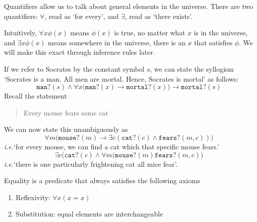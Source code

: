 \documentclass{scrbook}
\renewcommand{\implies}{\to}
\renewcommand{\iff}{\leftrightarrow}
\newcommand{\ie}{\emph{i.e.}\xspace}
\begin{document}
\begin{defn}[quantifier]
  Quantifiers allow us to talk about general elements in the universe. There are two quantifiers: $\forall$, read as `for every', and $\exists$, read as `there exists'.

  Intuitively, $\forall x \phi(x)$ means $\phi(x)$ is true, no matter what $x$ is in the universe, and $\exists x \phi(x)$ means somewhere in the universe, there is an $x$ that satisfies $\phi$. We will make this exact through inference rules later.
\end{defn}
If we refer to Socrates by the constant symbol $s$, we can state the syllogism `Socrates is a man. All men are mortal. Hence, Socrates is mortal' as follows:
\[
\texttt{man?}(s) \wedge \forall x \bigl(\texttt{man?}(x)\implies\texttt{mortal?}(x)\bigr) \implies \texttt{mortal?}(s)
\] 
Recall the statement
\begin{quote}
  Every mouse fears some cat
\end{quote}
We can now state this unambiguously as 
\[
\forall m \bigr(\texttt{mouse?}(m) \implies \exists c (\texttt{cat?}(c)\wedge \texttt{fears?}(m,c)) \bigl)
\]
\ie `for every mouse, we can find a cat which that specific mouse fears.'
\[
\exists c \bigl(\texttt{cat?}(c) \wedge \forall m (\texttt{mouse?}(m) \texttt{fears?}(m,c)\bigr)
\]
\ie `there is one particularly frightening cat all mice fear'.

\begin{defn}[equality]
  Equality is a predicate that always satisfies the following axioms
  \begin{enumerate}
  \item Reflexivity: $\forall x (x=x)$
  \item Substitution: equal elements are interchangeable 
  \end{enumerate}
\end{defn}
\end{document}
